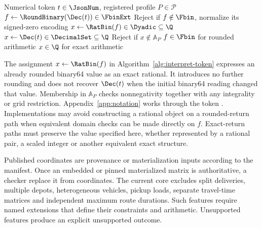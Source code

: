 \begin{algorithm}[htbp]
\caption{Interpret an arc or temporal JSON token under a selected profile}\label{alg:interpret-token}
\begin{algorithmic}[1]
\Require Numerical token $t\in\JsonNum$, registered profile $P\in\mathcal{P}$
\State $f\gets\RoundBinary(\Dec(t))\in\FbinExt$
\State Reject if $f\notin\Fbin$, normalize its signed-zero encoding
\State $x\gets\RatBin(f)\in\Dyadic\subseteq\Q$ 
\Else
\State $x\gets\Dec(t)\in\DecimalSet\subseteq\Q$
\EndIf
\State Reject if $x\notin\mathbb{A}_P$ 
\State \Return $f\in\Fbin$ for rounded arithmetic
\Else
\State \Return $x\in\Q$ for exact arithmetic
\EndIf
\end{algorithmic}
\end{algorithm}

The assignment $x\gets\RatBin(f)$ in Algorithm~\ref{alg:interpret-token} expresses an already rounded binary64 value as an exact rational. It introduces no further rounding and does not recover $\Dec(t)$ when the initial binary64 reading changed that value. Membership in $\mathbb{A}_P$ checks nonnegativity together with any integrality or grid restriction. Appendix~\ref{app:notation} works through the token . Implementations may avoid constructing a rational object on a rounded-return path when equivalent domain checks can be made directly on $f$. Exact-return paths must preserve the value specified here, whether represented by a rational pair, a scaled integer or another equivalent exact structure.

Published coordinates are provenance or materialization inputs according to the manifest. Once an embedded or pinned materialized matrix is authoritative, a checker \mustnot{} replace it from coordinates. The current core excludes split deliveries, multiple depots, heterogeneous vehicles, pickup loads, separate travel-time matrices and independent maximum route durations. Such features require named extensions that define their constraints and arithmetic. Unsupported features \must{} produce an explicit unsupported outcome.
